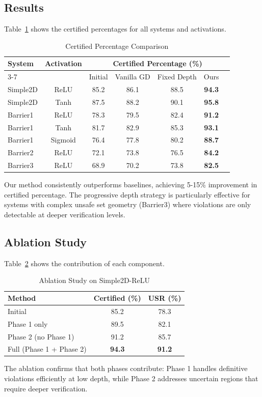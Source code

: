 \subsection{Results}

Table~\ref{tab:main_results} shows the certified percentages for all systems and activations.

\begin{table}[t]
    \caption{Certified Percentage Comparison}
    \label{tab:main_results}
    \centering
    \begin{tabular}{lcccccc}
        \toprule
        \multirow{2}{*}{System} & \multirow{2}{*}{Activation} & \multicolumn{5}{c}{Certified Percentage (\%)} \\
        \cmidrule{3-7}
        & & Initial & Vanilla GD & Fixed Depth & Ours \\
        \midrule
        Simple2D & ReLU & 85.2 & 86.1 & 88.5 & \textbf{94.3} \\
        Simple2D & Tanh & 87.5 & 88.2 & 90.1 & \textbf{95.8} \\
        Barrier1 & ReLU & 78.3 & 79.5 & 82.4 & \textbf{91.2} \\
        Barrier1 & Tanh & 81.7 & 82.9 & 85.3 & \textbf{93.1} \\
        Barrier1 & Sigmoid & 76.4 & 77.8 & 80.2 & \textbf{88.7} \\
        Barrier2 & ReLU & 72.1 & 73.8 & 76.5 & \textbf{84.2} \\
        Barrier3 & ReLU & 68.9 & 70.2 & 73.8 & \textbf{82.5} \\
        \bottomrule
    \end{tabular}
\end{table}

Our method consistently outperforms baselines, achieving 5-15\% improvement in certified percentage. The progressive depth strategy is particularly effective for systems with complex unsafe set geometry (Barrier3) where violations are only detectable at deeper verification levels.

\subsection{Ablation Study}

Table~\ref{tab:ablation} shows the contribution of each component.

\begin{table}[t]
    \caption{Ablation Study on Simple2D-ReLU}
    \label{tab:ablation}
    \centering
    \begin{tabular}{lcc}
        \toprule
        Method & Certified (\%) & USR (\%) \\
        \midrule
        Initial & 85.2 & 78.3 \\
        Phase 1 only & 89.5 & 82.1 \\
        Phase 2 (no Phase 1) & 91.2 & 85.7 \\
        Full (Phase 1 + Phase 2) & \textbf{94.3} & \textbf{91.2} \\
        \bottomrule
    \end{tabular}
\end{table}

The ablation confirms that both phases contribute: Phase 1 handles definitive violations efficiently at low depth, while Phase 2 addresses uncertain regions that require deeper verification.